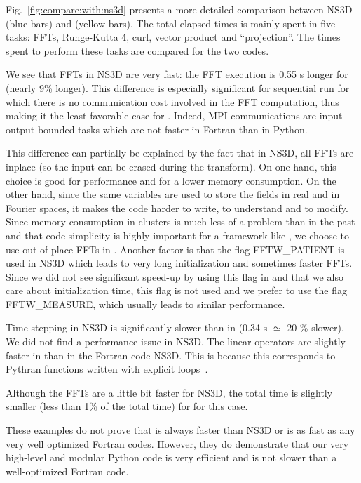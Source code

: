 \documentclass{../jors}
\begin{document}
Fig.~\ref{fig:compare:with:ns3d} presents a more detailed comparison between NS3D
(blue bars) and  (yellow bars).
%
The total elapsed times is mainly spent in five tasks: FFTs, Runge-Kutta 4, curl,
vector product and ``projection''. The times spent to perform these tasks are
compared for the two codes.

We see that FFTs in NS3D are very fast: the FFT execution is 0.55 s longer for
 (nearly 9\% longer). This difference is especially significant for
sequential run for which there is no communication cost involved in the FFT
computation, thus making it the least favorable case for .
Indeed, MPI communications are input-output bounded tasks which are not faster
in Fortran than in Python.

This difference can partially be explained by the fact that in NS3D, all FFTs are
inplace (so the input can be erased during the transform). On one hand, this
choice is good for performance and for a lower memory consumption.  On the other
hand, since the same variables are used to store the fields in real and in Fourier
spaces, it makes the code harder to write, to understand and to modify.  Since
memory consumption in clusters is much less of a problem than in the
past and that code simplicity is highly important for a framework like
, we choose to use out-of-place FFTs in .
%
Another factor is that the flag FFTW\_PATIENT is used in NS3D which leads to very
long initialization and sometimes faster FFTs. Since we did not see significant
speed-up by using this flag in  and that we also care about
initialization time, this flag is not used and we prefer to use the flag
FFTW\_MEASURE, which usually leads to similar performance.

Time stepping in NS3D is significantly slower than in  (0.34 s
$\simeq$ 20 \% slower). We did not find a performance issue in NS3D.
%
The linear operators are slightly faster in  than in the Fortran
code NS3D.  This is because this corresponds to Pythran functions written with
explicit loops~\cite[see][]{fluidfft}.

Although the FFTs are a little bit faster for NS3D, the total time is slightly
smaller (less than 1\% of the total time) for  for this case.

These examples do not prove that  is always faster than NS3D or
is as fast as any very well optimized Fortran codes. However, they do
demonstrate that our very high-level and modular Python code is very efficient
and is not slower than a well-optimized Fortran code.
\end{document}
